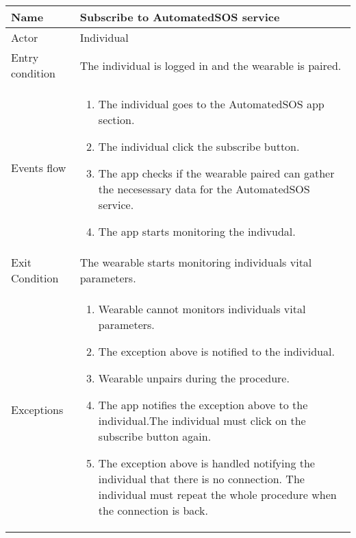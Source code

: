 \begin{tabular}{|l|p{13cm}|}
    \hline
    Name & Subscribe to AutomatedSOS service
    \\ \hline
    Actor & Individual
    \\ \hline 
    Entry condition & The individual is logged in and the wearable is paired.
        \\ \hline
    Events flow &
    \begin{enumerate}
	\item The individual goes to the AutomatedSOS app section.
    \item The individual click the subscribe button.
    \item The app checks if the wearable paired can gather the necesessary data for the AutomatedSOS service.
    \item The app starts monitoring the indivudal.
    \end{enumerate}
     \\ \hline
     Exit Condition & The wearable starts monitoring individuals vital parameters.
     \\
    \hline
    Exceptions &
        \begin{enumerate}
    \item Wearable cannot monitors individuals vital parameters.
    \item The exception above is notified to the individual.
    \item Wearable unpairs during the procedure.
    \item The app notifies the exception above to the individual.The individual must click on the subscribe button again.
    \item The exception above is handled notifying the individual that there is no connection. The individual must repeat the whole procedure when the connection is back.
    \end{enumerate}
      \\
    \hline
\end{tabular}



